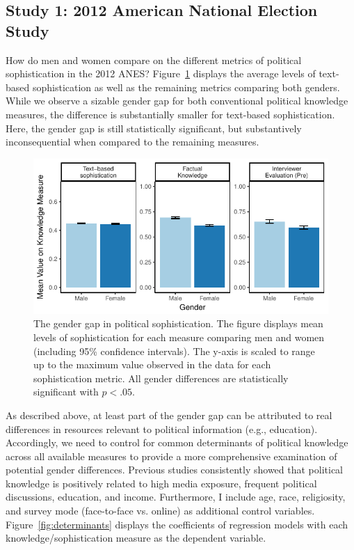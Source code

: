 \documentclass[12pt]{article}
\begin{document}
\subsection*{Study 1: 2012 American National Election Study}

How do men and women compare on the different metrics of political sophistication in the 2012 ANES? Figure~\ref{fig:meandiff} displays the average levels of text-based sophistication as well as the remaining metrics comparing both genders. While we observe a sizable gender gap for both conventional political knowledge measures, the difference is substantially smaller for text-based sophistication. Here, the gender gap is still statistically significant, but substantively inconsequential when compared to the remaining measures.

\begin{figure}[h]\centering
\includegraphics{../fig/meandiff_pres.pdf}
\caption{The gender gap in political sophistication. The figure displays mean levels of sophistication for each measure comparing men and women (including 95\% confidence intervals). The y-axis is scaled to range up to the maximum value observed in the data for each sophistication metric. All gender differences are statistically significant with $p<.05$.}\label{fig:meandiff}
\end{figure}

As described above, at least part of the gender gap can be attributed to real differences in resources relevant to political information (e.g., education). Accordingly, we need to control for common determinants of political knowledge across all available measures to provide a more comprehensive examination of potential gender differences. Previous studies consistently showed that political knowledge is positively related to high media exposure, frequent political discussions, education, and income. Furthermore, I include age, race, religiosity, and survey mode (face-to-face vs. online) as additional control variables. Figure~\ref{fig:determinants} displays the coefficients of regression models with each knowledge/sophistication measure as the dependent variable.
\end{document}
